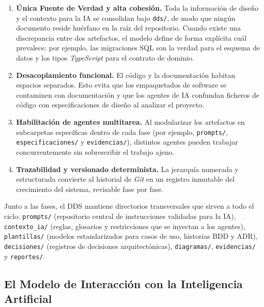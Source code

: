 \begin{enumerate}[leftmargin=*, itemsep=2pt, topsep=2pt]
    \item \textbf{Única Fuente de Verdad y alta cohesión.} Toda la información de
    diseño y el contexto para la IA se consolidan bajo \texttt{dds/}, de modo que
    ningún documento reside huérfano en la raíz del repositorio. Cuando existe una
    discrepancia entre dos artefactos, el modelo define de forma explícita cuál
    prevalece: por ejemplo, las migraciones SQL son la verdad para el esquema de
    datos y los tipos \textit{TypeScript} para el contrato de dominio.

    \item \textbf{Desacoplamiento funcional.} El código y la documentación habitan
    espacios separados. Esto evita que los empaquetados de software se contaminen
    con documentación y que los agentes de IA confundan ficheros de código con
    especificaciones de diseño al analizar el proyecto.

    \item \textbf{Habilitación de agentes multitarea.} Al modularizar los
    artefactos en subcarpetas específicas dentro de cada fase
    (por ejemplo, \texttt{prompts/}, \texttt{especificaciones/} y
    \texttt{evidencias/}), distintos agentes pueden trabajar concurrentemente sin
    sobrescribir el trabajo ajeno.

    \item \textbf{Trazabilidad y versionado determinista.} La jerarquía numerada y
    estructurada convierte al historial de \textit{Git} en un registro inmutable
    del crecimiento del sistema, revisable fase por fase.
\end{enumerate}

Junto a las fases, el DDS mantiene directorios transversales que sirven a todo el
ciclo: \texttt{prompts/} (repositorio central de instrucciones validadas para la
IA), \texttt{contexto\_ia/} (reglas, glosarios y restricciones que se inyectan a
los agentes), \texttt{plantillas/} (modelos estandarizados para casos de uso,
historias BDD y ADR), \texttt{decisiones/} (registros de decisiones
arquitectónicas), \texttt{diagramas/}, \texttt{evidencias/} y \texttt{reportes/}.

\subsection{El Modelo de Interacción con la Inteligencia Artificial}
\label{subsec:dds_ia}

